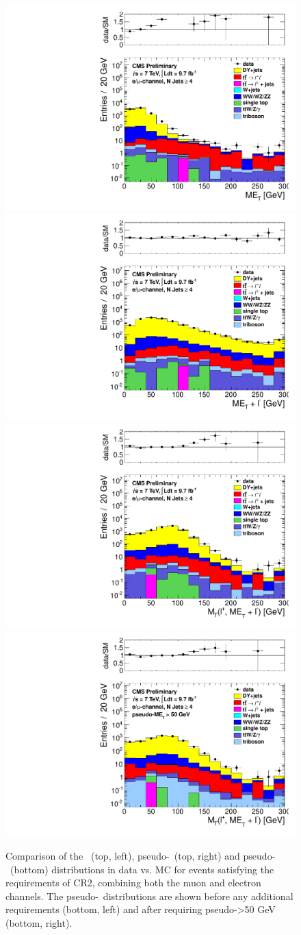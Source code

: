 \begin{figure}[hbt]
  \begin{center}
	\includegraphics[width=0.5\linewidth]{plots/CR2plots/met_scaled_nj4_emucomb.pdf}%
	\includegraphics[width=0.5\linewidth]{plots/CR2plots/met_lepcor_scaled_nj4_emucomb.pdf}
	\includegraphics[width=0.5\linewidth]{plots/CR2plots/mt_lepcor_scaled_nj4_emucomb.pdf}%
	\includegraphics[width=0.5\linewidth]{plots/CR2plots/mt_lepcor_scaled_met50_nj4_emucomb.pdf}
    \caption{
      Comparison of the \met\ (top, left), pseudo-\met\ (top, right)
      and pseudo-\mt\ (bottom) distributions in data vs. MC for events
      satisfying the requirements of CR2, combining both the muon and
      electron channels. The pseudo-\mt\ distributions are shown
      before any additional requirements (bottom, left) and after
      requiring pseudo-\met>50 GeV (bottom, right).
\label{fig:cr2met} 
}  
      \end{center}
\end{figure}

